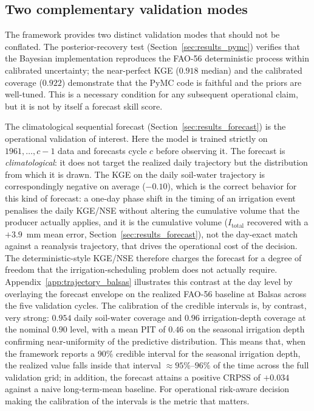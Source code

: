\documentclass[review,5p,times]{elsarticle}
\begin{document}
\subsection{Two complementary validation modes}

The framework provides two distinct validation modes that should not
be conflated. The posterior-recovery test (Section~\ref{sec:results_pymc})
verifies that the Bayesian implementation reproduces the FAO-56
deterministic process within calibrated uncertainty; the
near-perfect KGE ($0.918$ median) and the calibrated coverage
($0.922$) demonstrate that the PyMC code is faithful and the priors
are well-tuned. This is a necessary condition for any subsequent
operational claim, but it is not by itself a forecast skill score.

The climatological sequential forecast
(Section~\ref{sec:results_forecast}) is the operational validation
of interest. Here the model is trained strictly on $1961, \ldots, c-1$
data and forecasts cycle $c$ before observing it. The forecast is
\emph{climatological}: it does not target the realized daily
trajectory but the distribution from which it is drawn. The KGE on
the daily soil-water trajectory is correspondingly negative on
average ($-0.10$), which is the correct behavior for this kind of
forecast: a one-day phase shift in the timing of an irrigation event
penalises the daily KGE/NSE without altering the cumulative volume
that the producer actually applies, and it is the cumulative volume
($I_{\mathrm{total}}$ recovered with a $+3.9$~mm mean error,
Section~\ref{sec:results_forecast}), not the day-exact match against
a reanalysis trajectory, that drives the operational cost of the
decision. The deterministic-style KGE/NSE therefore charges the
forecast for a degree of freedom that the irrigation-scheduling
problem does not actually require. Appendix~\ref{app:trajectory_balsas}
illustrates this contrast at the day level by overlaying the
forecast envelope on the realized FAO-56 baseline at Balsas across
the five validation cycles. The calibration of the credible intervals is, by contrast,
very strong: $0.954$ daily soil-water coverage and $0.96$
irrigation-depth coverage at the nominal $0.90$ level, with a mean
PIT of $0.46$ on the seasonal irrigation depth confirming
near-uniformity of the predictive distribution. This means that,
when the framework reports a $90\%$ credible interval for the
seasonal irrigation depth, the realized value falls inside that
interval $\approx 95\%$--$96\%$ of the time across the full
validation grid; in addition, the forecast attains a positive CRPSS
of $+0.034$ against a naive long-term-mean baseline. For operational
risk-aware decision making the calibration of the intervals is the
metric that matters.
\end{document}
